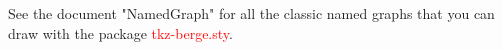 \documentclass[DIV=15,fontsize=10,headinclude=false,index=totoc,
footinclude=false,headings=small]{tkz-doc}
\begin{document}
See the document "NamedGraph" for all the classic named graphs that you can draw with the package \textcolor{red}{tkz-berge.sty}.
\tkzSetUpColors[background=fondpaille,text=Maroon] 


 

     

\printindex  
\end{document}
